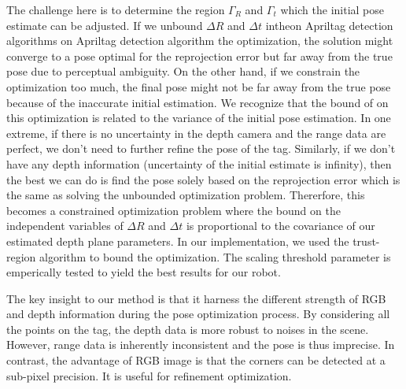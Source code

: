 The challenge here is to determine the region $\Gamma_R$ and $\Gamma_t$ which the initial pose estimate can be adjusted. If we unbound $\Delta R$ and $\Delta t$ intheon Apriltag detection algorithms on Apriltag detection algorithm the optimization, the solution might converge to a pose optimal for the reprojection error but far away from the true pose due to perceptual ambiguity. On the other hand, if we constrain the optimization too much, the final pose might not be far away from the true pose because of the inaccurate initial estimation. We recognize that the bound of on this optimization is related to the variance of the initial pose estimation. In one extreme, if there is no uncertainty in the depth camera and the range data are perfect, we don't need to further refine the pose of the tag. Similarly, if we don't have any depth information (uncertainty of the initial estimate is infinity), then the best we can do is find the pose solely based on the reprojection error which is the same as solving the unbounded optimization problem. Thererfore, this becomes a constrained optimization problem where the bound on the independent variables of $\Delta R$ and $\Delta t$ is proportional to the covariance of our estimated depth plane parameters. In our implementation, we used the trust-region algorithm to bound the optimization. The scaling threshold parameter is emperically tested to yield the best results for our robot. 

The key insight to our method is that it harness the different strength of RGB and depth information during the pose optimization process. By considering all the points on the tag, the depth data is more robust to noises in the scene. However, range data is inherently inconsistent and the pose is thus imprecise. In contrast, the advantage of RGB image is that the corners can be detected at a sub-pixel precision. It is useful for refinement optimization.  